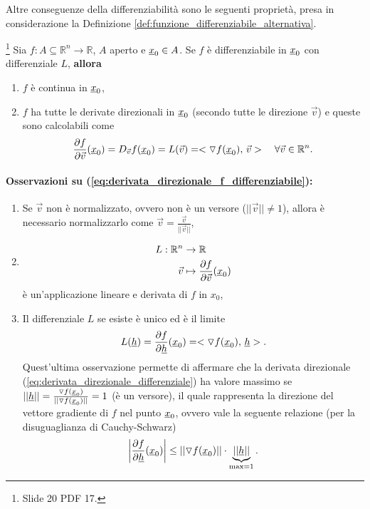 Altre conseguenze della differenziabilità sono le seguenti proprietà, presa in considerazione la Definizione \ref{def:funzione_differenziabile_alternativa}.

\begin{proposition}\label{prop:f_diff_continua}\footnote{Slide 20 PDF 17.}
	Sia $f:A\subseteq\mathbb{R}^n\rightarrow\mathbb{R}$, $A$ aperto e $\uline x_0\in A$. Se $f$ è differenziabile in $\uline x_0$ con differenziale $L$, \textbf{allora}
	\begin{enumerate}
		\item $f$ è continua in $\uline x_0$,
		\item $f$ ha tutte le derivate direzionali in $\uline x_0$ (secondo tutte le direzione $\vec{v}$) e queste sono calcolabili come
		\begin{equation}\label{eq:derivata_direzionale_f_differenziabile}
			\frac{\partial f}{\partial \vec{v}}(\uline x_0) = D_{\vec{v}}f(\uline x_0) = L(\vec{v}) = <\triangledown f(\uline x_0),\, \vec{v}>\quad \forall\vec{v}\in\mathbb{R}^n.
		\end{equation}
	\end{enumerate}
\end{proposition}
\paragraph{Osservazioni su (\ref{eq:derivata_direzionale_f_differenziabile}):}
\begin{enumerate}
	\item Se $\vec{v}$ non è normalizzato, ovvero non è un versore ($||\vec{v}||\neq 1$), allora è necessario normalizzarlo come $\vec{v}=\frac{\vec{v}}{||\vec{v}||}$,
	\item 
	\begin{equation*}
		\begin{aligned}
			L:\mathbb{R}^n&\rightarrow\mathbb{R}\\
			\vec{v}&\mapsto \frac{\partial f}{\partial \vec{v}}(\uline x_0)
		\end{aligned}
	\end{equation*}
	è un'applicazione lineare e derivata di $f$ in $x_0$,
	\item  Il differenziale $L$ se esiste è unico ed è il limite
	\begin{equation}\label{eq:derivata_direzionale_differenziale}
		L(\uline h) = \frac{\partial f}{\partial \uline h}(\uline x_0) = <\triangledown f(\uline x_0),\,\uline h>.
	\end{equation}
	Quest'ultima osservazione permette di affermare che la derivata direzionale (\ref{eq:derivata_direzionale_differenziale}) ha valore massimo se $||\uline h||=\frac{\triangledown f(\uline x_0)}{||\triangledown f(\uline x_0)||} = 1$ (è un versore), il quale rappresenta la direzione del vettore gradiente di $f$ nel punto $\uline x_0$, ovvero vale la seguente relazione (per la disuguaglianza di Cauchy-Schwarz)
	\begin{equation*}
		\left|\frac{\partial f}{\partial \uline h}(\uline x_0)\right| \leq ||\triangledown f(\uline x_0)||\cdot \underbrace{||\uline h||}_{\text{max}=1}.
	\end{equation*}
\end{enumerate}

